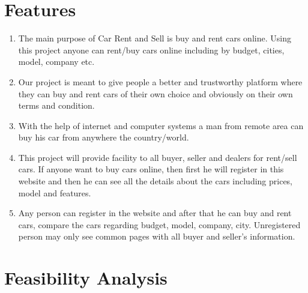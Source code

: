 \documentclass[10pt,twosides]{report}
\begin{document}
\noindent 

\noindent 

\noindent 

\noindent 

\noindent 

\noindent 

\noindent 


\newpage


\section{   Features}

\noindent 


\begin{enumerate}
\item         The main purpose of Car Rent and Sell is buy and rent cars online. Using this project anyone can rent/buy cars online including by budget, cities, model, company etc.

\item 	Our project is meant to give people a better and trustworthy platform where they can buy and rent cars of their own choice and obviously on their own terms and condition.

\item 	With the help of internet and computer systems a man from remote area can buy his car from anywhere the country/world.

\item        This project will provide facility to all buyer, seller and dealers for rent/sell cars. If anyone want to buy cars online, then first he will register in this website and then he can see all the details about the cars including prices, model and features.

\item        Any person can register in the website and after that he can buy and rent cars, compare the cars regarding budget, model, company, city. Unregistered person may only see common pages with all buyer and seller’s information.
\end{enumerate}

\noindent 

\noindent 

\noindent 

\noindent 

\noindent 




\section{    Feasibility Analysis}
\end{document}
